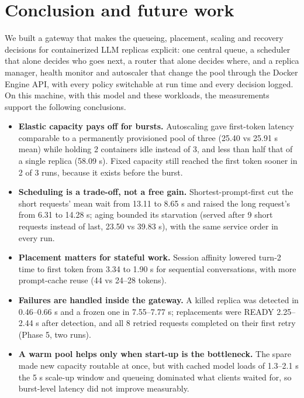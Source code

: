 \documentclass[11pt,a4paper]{article}
\begin{document}
\section{Conclusion and future work}
\label{sec:conclusion}

We built a gateway that makes the queueing, placement, scaling and recovery decisions for
containerized LLM replicas explicit: one central queue, a scheduler that alone decides who goes
next, a router that alone decides where, and a replica manager, health monitor and autoscaler that
change the pool through the Docker Engine API, with every policy switchable at run time and every
decision logged. On this machine, with this model and these workloads, the measurements support
the following conclusions.

\begin{itemize}
  \item \textbf{Elastic capacity pays off for bursts.} Autoscaling gave first-token latency
        comparable to a permanently provisioned pool of three (25.40 vs 25.91 s mean) while holding
        2 containers idle instead of 3, and less than half that of a single replica (58.09 s).
        Fixed capacity still reached the first token sooner in 2 of 3 runs, because it exists
        before the burst.
  \item \textbf{Scheduling is a trade-off, not a free gain.} Shortest-prompt-first cut the short
        requests' mean wait from 13.11 to 8.65 s and raised the long request's from 6.31 to
        14.28 s; aging bounded its starvation (served after 9 short requests instead of last,
        23.50 vs 39.83 s), with the same service order in every run.
  \item \textbf{Placement matters for stateful work.} Session affinity lowered turn-2 time to first
        token from 3.34 to 1.90 s for sequential conversations, with more prompt-cache reuse (44 vs
        24--28 tokens).
  \item \textbf{Failures are handled inside the gateway.} A killed replica was detected in
        0.46--0.66 s and a frozen one in 7.55--7.77 s; replacements were READY 2.25--2.44 s after
        detection, and all 8 retried requests completed on their first retry (Phase 5, two runs).
  \item \textbf{A warm pool helps only when start-up is the bottleneck.} The spare made new
        capacity routable at once, but with cached model loads of 1.3--2.1 s the 5 s scale-up
        window and queueing dominated what clients waited for, so burst-level latency did not
        improve measurably.
\end{itemize}
\end{document}
